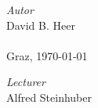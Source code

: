 \begin{titlepage}
\begin{center}
	\begin{minipage}{0.4\textwidth}
	    \begin{flushleft} \large
		\emph{Autor}\\
	        David B. Heer\\ ~ \\
		Graz, \today
	    \end{flushleft}
	\end{minipage}
	\hfill
	\begin{minipage}{0.4\textwidth}
	    \begin{flushright} \large
	        \emph{Lecturer} \\
	        Alfred Steinhuber \\ ~ \\
	    \end{flushright}
	\end{minipage}
	
	\end{center}

\end{titlepage}

